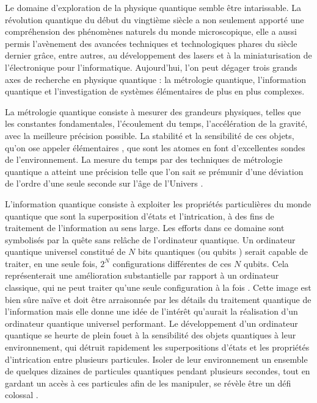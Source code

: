 \bigskip
Le domaine d'exploration de la physique quantique semble être intarissable.
La \og révolution quantique \fg{} du début du vingtième siècle a non seulement apporté une compréhension des phénomènes naturels du monde microscopique, elle a aussi permis l'avènement des avancées techniques et technologiques phares du siècle dernier grâce, entre autres, au développement des lasers et à la miniaturisation de l'électronique pour l'informatique.
Aujourd'hui, l'on peut dégager trois grands axes de recherche en physique quantique : la métrologie quantique, l'information quantique et l'investigation de systèmes élémentaires de plus en plus complexes.

La métrologie quantique consiste à mesurer des grandeurs physiques, telles que les constantes fondamentales, l'écoulement du temps, l'accélération de la gravité, avec la meilleure précision possible.
La stabilité et la sensibilité de ces objets, qu'on ose appeler \og élémentaires \fg{}, que sont les atomes en font d'excellentes sondes de l'environnement.
La mesure du temps par des techniques de métrologie quantique a atteint une précision telle que l'on sait se prémunir d'une déviation de l'ordre d'une seule seconde sur l'âge de l'Univers \cite{Ludlow2015,Oates2013}.

L'information quantique consiste à exploiter les propriétés particulières du monde quantique que sont la superposition d'états et l'intrication, à des fins de traitement de l'information au sens large.
Les efforts dans ce domaine sont symbolisés par la quête sans relâche de l'ordinateur quantique.
Un ordinateur quantique universel constitué de $N$ bits quantiques (ou \og qubits \fg{}) serait capable de traiter, en une seule fois, $2^N$ configurations différentes de ces $N$ qubits.
Cela représenterait une amélioration substantielle par rapport à un ordinateur classique, qui ne peut traiter qu'une seule configuration à la fois \cite{deutsch1985}.
Cette image est bien sûre naïve et doit être arraisonnée par les détails du traitement quantique de l'information mais elle donne une idée de l'intérêt qu'aurait la réalisation d'un ordinateur quantique universel performant.
Le développement d'un ordinateur quantique se heurte de plein fouet à la sensibilité des objets quantiques à leur environnement, qui détruit rapidement les superpositions d'états et les propriétés d'intrication entre plusieurs particules.
Isoler de leur environnement un ensemble de quelques dizaines de particules quantiques pendant plusieurs secondes, tout en gardant un accès à ces particules afin de les manipuler, se révèle être un défi colossal \cite{QM_ZUREKDECOH91}.

